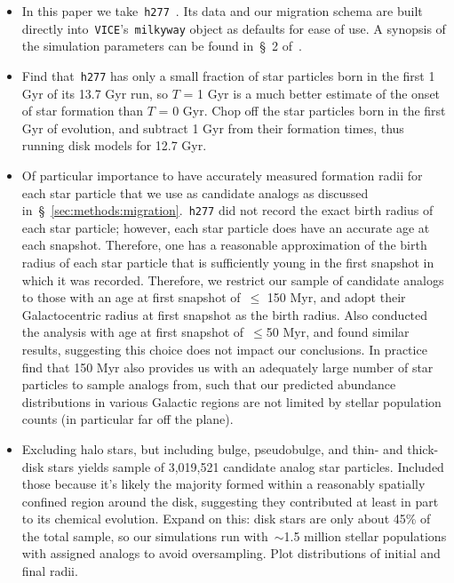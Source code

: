 \documentclass[a4paper, fleqn, usenatbib, useAMS]{mnras}
\begin{document}
\begin{itemize} 
	\item In this paper we take~\texttt{h277}~\citep{Christensen2012, 
	Zolotov2012, Loebman2012, Loebman2014, Brooks2014}. Its data and our 
	migration schema are built directly into~\texttt{VICE}'s~\texttt{milkyway} 
	object as defaults for ease of use. A synopsis of the simulation parameters 
	can be found in~\S~2 of~\citet{Bird2020}. 

	\item Find that~\texttt{h277} has only a small fraction of star 
	particles born in the first 1 Gyr of its 13.7 Gyr run, so $T$ = 1 Gyr 
	is a much better estimate of the onset of star formation than 
	$T$ = 0 Gyr. Chop off the star particles born in the first Gyr of 
	evolution, and subtract 1 Gyr from their formation times, thus running 
	disk models for 12.7 Gyr. 

	\item Of particular importance to have accurately measured formation radii 
	for each star particle that we use as candidate analogs as discussed 
	in~\S~\ref{sec:methods:migration}.~\texttt{h277} did not record the 
	exact birth radius of each star particle; however, each star particle does 
	have an accurate age at each snapshot. Therefore, one has a reasonable 
	approximation of the birth radius of each star particle that is 
	sufficiently young in the first snapshot in which it was recorded. 
	Therefore, we restrict our sample of candidate analogs to those with an 
	age at first snapshot of~$\leq$ 150 Myr, and adopt their Galactocentric 
	radius at first snapshot as the birth radius. Also conducted the analysis 
	with age at first snapshot of~$\leq$50 Myr, and found similar results, 
	suggesting this choice does not impact our conclusions. In practice find 
	that 150 Myr also provides us with an adequately large number of star 
	particles to sample analogs from, such that our predicted abundance 
	distributions in various Galactic regions are not limited by stellar 
	population counts (in particular far off the plane). 

	\item Excluding halo stars, but including bulge, pseudobulge, and thin- 
	and thick-disk stars yields sample of 3,019,521 candidate analog star 
	particles. Included those because it's likely the majority formed within 
	a reasonably spatially confined region around the disk, suggesting they 
	contributed at least in part to its chemical evolution. 
	{\color{red} Expand on this: disk stars are only about 45\% of the total 
	sample, so our simulations run with~$\sim$1.5 million stellar populations 
	with assigned analogs to avoid oversampling. Plot distributions of 
	initial and final radii. } 


\end{itemize}
\end{document}
